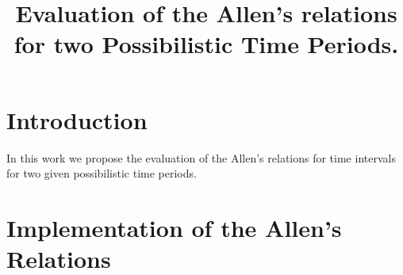 \documentclass{llncs}
\begin{document}
\mainmatter              %
%
\title{Evaluation of the Allen's relations for two Possibilistic Time Periods.}
%
%
\author{
 }
%
%
%
\institute{
}

\maketitle              %

\begin{abstract}

\end{abstract}

\section{\label{sec:intro}Introduction}
In this work we propose the evaluation of the Allen's relations for time intervals for two given possibilistic time periods.


\section{\label{sec:implementation}Implementation of the Allen's Relations}
\end{document}
